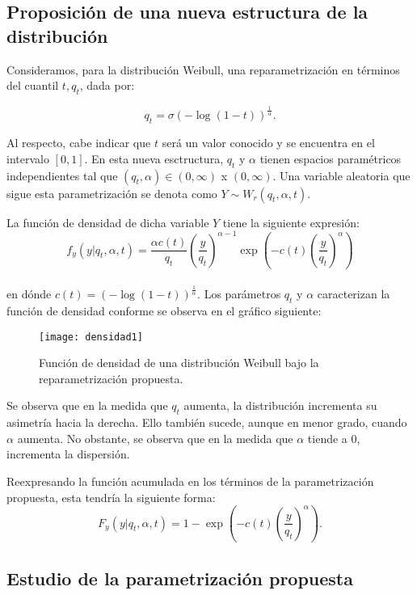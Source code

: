 \subsection{Proposición de una nueva estructura de la distribución}

Consideramos, para la distribución Weibull, una reparametrización en términos del cuantil $t, q_{t}$, dada por:

\[q_{t}=\sigma\left( -\log\left( 1-t \right) \right)^{\frac{1}{\alpha}}.\]

Al respecto, cabe indicar que $t$ será un valor conocido y se encuentra en el intervalo $[0,1]$. En esta nueva esctructura, $q_{t}$ y $\alpha$ tienen espacios paramétricos independientes tal que $(q_{t},\alpha) \in (0,\infty)$ x $(0,\infty)$. Una variable aleatoria que sigue esta parametrización se denota como $Y \sim W_{r}(q_{t},\alpha,t)$.

La función de densidad de dicha variable $Y$ tiene la siguiente expresión:
\begin{equation}
f_{y}(y| q_{t},\alpha,t)=\frac{\alpha c(t)}{q_{t}}\left( \frac{y}{q_{t}} \right)^{\alpha-1}\exp\left( -c(t)\left( \frac{y}{q_{t}} \right)^{\alpha} \right)
\end{equation}
\\
\noindent en dónde $c(t)= \left( -\log(1-t) \right)^{\frac{1}{\alpha}}$. Los parámetros $q_{t}$ y $\alpha$ caracterizan la función de densidad conforme se observa en el gráfico siguiente:

\begin{figure}[H]
\texttt{[image: densidad1]}
\caption{Función de densidad de una distribución Weibull bajo la reparametrización propuesta.}
\end{figure}

\noindent Se observa que en la medida que $q_{t}$ aumenta, la distribución incrementa su asimetría hacia la derecha. Ello también sucede, aunque en menor grado, cuando $\alpha$ aumenta. No obstante, se observa que en la medida que $\alpha$ tiende a 0, incrementa la dispersión.

Reexpresando la función acumulada en los términos de la parametrización propuesta, esta tendría la siguiente forma:
\begin{equation} \label{eq:1}
F_{y}\left(y| q_{t},\alpha,t \right)=1-\exp\left( -c(t)\left( \frac{y}{q_{t}} \right)^{\alpha} \right).
\end{equation}
\subsection{Estudio de la parametrización propuesta}

